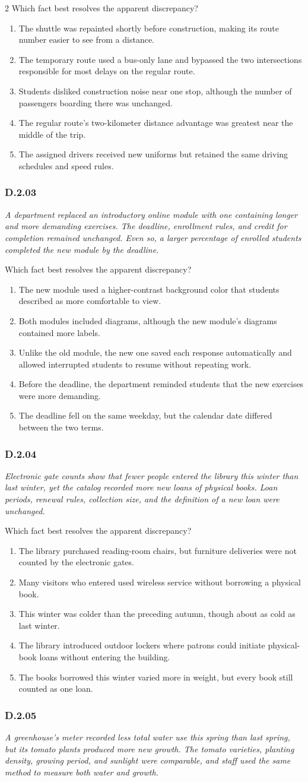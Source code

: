 \documentclass[10pt]{extarticle}
\newcommand{\choice}[1]{\item #1}
\newcommand{\bankitem}[1]{\subsubsection*{#1}}
\begin{document}
\begin{multicols}{2}
Which fact best resolves the apparent discrepancy?
\begin{enumerate}[label=(\alph*)]
  \choice{The shuttle was repainted shortly before construction, making its route number easier to see from a distance.}
  \choice{The temporary route used a bus-only lane and bypassed the two intersections responsible for most delays on the regular route.}
  \choice{Students disliked construction noise near one stop, although the number of passengers boarding there was unchanged.}
  \choice{The regular route's two-kilometer distance advantage was greatest near the middle of the trip.}
  \choice{The assigned drivers received new uniforms but retained the same driving schedules and speed rules.}
\end{enumerate}
\bankitem{D.2.03}
\emph{A department replaced an introductory online module with one containing longer and more demanding exercises. The deadline, enrollment rules, and credit for completion remained unchanged. Even so, a larger percentage of enrolled students completed the new module by the deadline.}

Which fact best resolves the apparent discrepancy?
\begin{enumerate}[label=(\alph*)]
  \choice{The new module used a higher-contrast background color that students described as more comfortable to view.}
  \choice{Both modules included diagrams, although the new module's diagrams contained more labels.}
  \choice{Unlike the old module, the new one saved each response automatically and allowed interrupted students to resume without repeating work.}
  \choice{Before the deadline, the department reminded students that the new exercises were more demanding.}
  \choice{The deadline fell on the same weekday, but the calendar date differed between the two terms.}
\end{enumerate}
\bankitem{D.2.04}
\emph{Electronic gate counts show that fewer people entered the library this winter than last winter, yet the catalog recorded more new loans of physical books. Loan periods, renewal rules, collection size, and the definition of a new loan were unchanged.}

Which fact best resolves the apparent discrepancy?
\begin{enumerate}[label=(\alph*)]
  \choice{The library purchased reading-room chairs, but furniture deliveries were not counted by the electronic gates.}
  \choice{Many visitors who entered used wireless service without borrowing a physical book.}
  \choice{This winter was colder than the preceding autumn, though about as cold as last winter.}
  \choice{The library introduced outdoor lockers where patrons could initiate physical-book loans without entering the building.}
  \choice{The books borrowed this winter varied more in weight, but every book still counted as one loan.}
\end{enumerate}
\bankitem{D.2.05}
\emph{A greenhouse's meter recorded less total water use this spring than last spring, but its tomato plants produced more new growth. The tomato varieties, planting density, growing period, and sunlight were comparable, and staff used the same method to measure both water and growth.}


\end{multicols}
\end{document}
